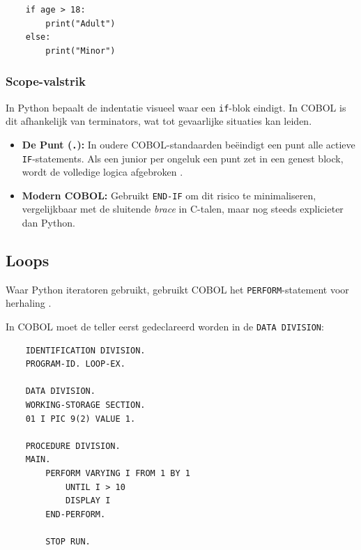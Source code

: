 \begin{listing}[H]
  \begin{verbatim}
    if age > 18:
        print("Adult")
    else:
        print("Minor")
  \end{verbatim}
  \caption[Conditional in Python]{Conditional in Python.}
  \label{lst:python_conditional}
\end{listing}

\subsubsection{Scope-valstrik}
In Python bepaalt de indentatie visueel waar een \texttt{if}-blok eindigt. In COBOL is dit afhankelijk van terminators, wat tot gevaarlijke situaties kan leiden.

\begin{itemize}
    \item \textbf{De Punt (\texttt{.}):} In oudere COBOL-standaarden beëindigt een punt alle actieve \texttt{IF}-statements. Als een junior per ongeluk een punt zet in een genest block, wordt de volledige logica afgebroken \autocite{IBM2023}.
    \item \textbf{Modern COBOL:} Gebruikt \texttt{END-IF} om dit risico te minimaliseren, vergelijkbaar met de sluitende \textit{brace} in C-talen, maar nog steeds explicieter dan Python.
\end{itemize}

\subsection{Loops}
Waar Python iteratoren gebruikt, gebruikt COBOL het \texttt{PERFORM}-statement voor herhaling \autocite{Foundation2026}.

In COBOL moet de teller eerst gedeclareerd worden in de \texttt{DATA DIVISION}:


\begin{listing}[H]
  \begin{verbatim}
    IDENTIFICATION DIVISION.
    PROGRAM-ID. LOOP-EX.

    DATA DIVISION.
    WORKING-STORAGE SECTION.
    01 I PIC 9(2) VALUE 1.

    PROCEDURE DIVISION.
    MAIN.
        PERFORM VARYING I FROM 1 BY 1
            UNTIL I > 10
            DISPLAY I
        END-PERFORM.

        STOP RUN.
  \end{verbatim}
  \caption[Iteratie in COBOL]{Iteratie in COBOL.}
  \label{lst:cobol_loop}
\end{listing}

